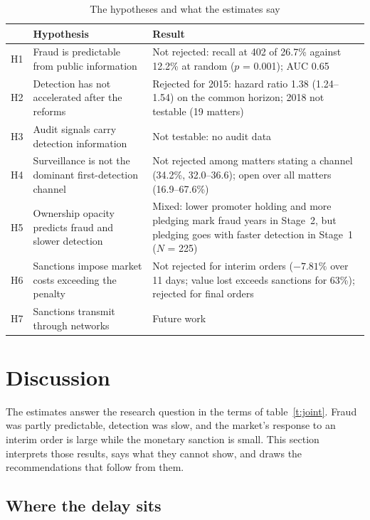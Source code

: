 \documentclass[letterpaper,11pt,leqno]{article}
\begin{document}
\begin{table}[htb]
\caption{The hypotheses and what the estimates say}
\begin{tabular*}{\textwidth}[]{L{0.6cm}@{\extracolsep\fill}L{4.5cm}L{8.2cm}}
\toprule
& Hypothesis & Result \\
\midrule
H1 & Fraud is predictable from public information & Not rejected: recall at 402 of 26.7\% against 12.2\% at random ($p$ = 0.001); AUC 0.65 \\
H2 & Detection has not accelerated after the reforms & Rejected for 2015: hazard ratio 1.38 (1.24--1.54) on the common horizon; 2018 not testable (19 matters) \\
H3 & Audit signals carry detection information & Not testable: no audit data \\
H4 & Surveillance is not the dominant first-detection channel & Not rejected among matters stating a channel (34.2\%, 32.0--36.6); open over all matters (16.9--67.6\%) \\
H5 & Ownership opacity predicts fraud and slower detection & Mixed: lower promoter holding and more pledging mark fraud years in Stage~2, but pledging goes with faster detection in Stage~1 ($N$ = 225) \\
H6 & Sanctions impose market costs exceeding the penalty & Not rejected for interim orders ($-7.81\%$ over 11 days; value lost exceeds sanctions for 63\%); rejected for final orders \\
H7 & Sanctions transmit through networks & Future work \\
\bottomrule
\end{tabular*}
\label{t:verdicts}\end{table}

\FloatBarrier
\section{Discussion}\label{s:discussion}

The estimates answer the research question in the terms of table~\ref{t:joint}. Fraud was partly predictable, detection was slow, and the market's response to an interim order is large while the monetary sanction is small. This section interprets those results, says what they cannot show, and draws the recommendations that follow from them.

\subsection{Where the delay sits}
\end{document}
